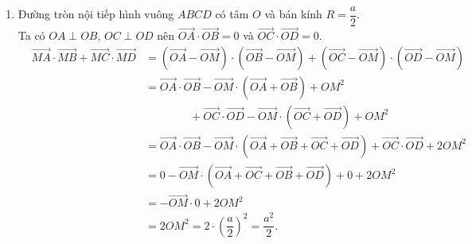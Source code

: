 \begin{vd}
{\begin{enumerate}
\begin{itemize}
		\item Ta có $\vec{BA}$ ngược hướng với $\vec{AB}$ nên $\left(\vec{BA},\vec{AB}\right)=180^{\circ}$.\\
		Do đó $\vec{BA}\cdot \vec{AB}=\left|\vec{BA}\right|\cdot\left|\vec{AB}\right|\cos\left(\vec{BA},\vec{AB}\right)=a\cdot a\cdot \cos 180^{\circ}=-a^2$.\\
		Lại có $NB \perp AB$ (do $N$ nằm trên $BC$) nên $\vec{NB} \cdot \vec{AB} = 0$.\\
		Ta có $\vec{NA} \cdot \vec{AB} = \left(\vec{NB}+\vec{BA}\right)\cdot \vec{AB} = \vec{NB}\cdot \vec{AB}+ \vec{BA} \cdot \vec{AB} = 0 - a^2=-a^2$.
		\end{itemize}
		\item Đường tròn nội tiếp hình vuông $ABCD$ có tâm $O$ và bán kính $R=\dfrac{a}{2}$.\\
		Ta có $OA\perp OB$, $OC\perp OD$ nên $\vec{OA} \cdot \vec{OB}=0$ và $\vec{OC} \cdot \vec{OD}=0$.
		\allowdisplaybreaks
		\begin{eqnarray*}
			&\vec{MA}\cdot \vec{MB}+ \vec{MC}\cdot \vec{MD}  & =\left(\vec{OA}-\vec{OM}\right) \cdot \left(\vec{OB}-\vec{OM}\right) + \left(\vec{OC}-\vec{OM}\right) \cdot \left(\vec{OD}-\vec{OM}\right) \\
			& &=\vec{OA} \cdot \vec{OB} - \vec{OM} \cdot \left( \vec{OA} + \vec{OB} \right)+ OM^2 \\
			& & \quad \quad \quad \quad + \vec{OC} \cdot \vec{OD} - \vec{OM} \cdot \left( \vec{OC} + \vec{OD} \right)+ OM^2\\
			& &= \vec{OA} \cdot \vec{OB} - \vec{OM} \cdot \left( \vec{OA} + \vec{OB} + \vec{OC} + \vec{OD}\right) + \vec{OC} \cdot \vec{OD} + 2 OM^2\\
			& &= 0 - \vec{OM} \cdot \left( \vec{OA} + \vec{OC} + \vec{OB} + \vec{OD}\right) +0 +2OM^2\\
			& &= - \vec{OM} \cdot 0 +2OM^2\\
			& &= 2OM^2=2 \cdot \left( \dfrac{a}{2} \right)^2= \dfrac{a^2}{2}.
		\end{eqnarray*}
	\end{enumerate}}
\end{vd}
